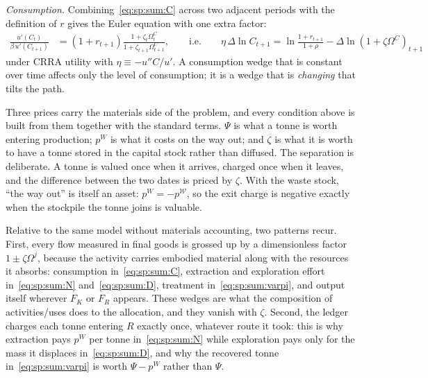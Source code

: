 \emph{Consumption.} Combining~\eqref{eq:sp:sum:C} across two adjacent periods with the definition of $r$ gives the Euler equation with one extra factor:
\begin{align}
\frac{u'\left(C_t\right)}{\beta\,u'\left(C_{t+1}\right)} &= \left(1+r_{t+1}\right)\frac{1+\zeta_t\Omega^C_t}{1+\zeta_{t+1}\Omega^C_{t+1}},
\qquad\text{i.e.}\qquad
\eta\,\Delta\ln C_{t+1} = \ln\frac{1+r_{t+1}}{1+\rho}-\Delta\ln\left(1+\zeta\Omega^C\right)_{t+1}
\label{eq:sp:sum:Cgrowth}
\end{align}
under CRRA utility with $\eta\equiv-u''C/u'$. A consumption wedge that is constant over time affects only the level of consumption; it is a wedge that is \emph{changing} that tilts the path.



 Three prices carry the materials side of the problem, and every condition above is built from them together with the standard terms. $\Psi$ is what a tonne is worth entering production; $p^W$ is what it costs on the way out; and $\zeta$ is what it is worth to have a tonne stored in the capital stock rather than diffused. The separation is deliberate. A tonne is valued once when it arrives, charged once when it leaves, and the difference between the two dates is priced by $\zeta$. With the waste stock, ``the way out'' is itself an asset: $p^W=-p^{\mathcal W}$, so the exit charge is negative exactly when the stockpile the tonne joins is valuable.

Relative to the same model without materials accounting, two patterns recur. First, every flow measured in final goods is grossed up by a dimensionless factor $1\pm\zeta\Omega^j$, because the activity carries embodied material along with the resources it absorbs: consumption in~\eqref{eq:sp:sum:C}, extraction and exploration effort in~\eqref{eq:sp:sum:N} and~\eqref{eq:sp:sum:D}, treatment in~\eqref{eq:sp:sum:varpi}, and output itself wherever $F_K$ or $F_R$ appears. These wedges are what the composition of activities/uses does to the allocation, and they vanish with $\zeta$. Second, the ledger charges each tonne entering $R$ exactly once, whatever route it took: this is why extraction pays $p^W$ per tonne in~\eqref{eq:sp:sum:N} while exploration pays only for the mass it displaces in~\eqref{eq:sp:sum:D}, and why the recovered tonne in~\eqref{eq:sp:sum:varpi} is worth $\Psi-p^W$ rather than $\Psi$.


